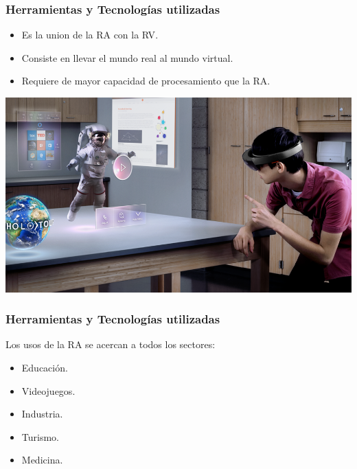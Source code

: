 \begin{frame}
	\frametitle{Herramientas y Tecnologías utilizadas}
			\begin{itemize}
				\item {Es la union de la RA con la RV}.
				\item {Consiste en llevar el mundo real al mundo virtual.}
				\item {Requiere de mayor capacidad de procesamiento que la RA.}
			\end{itemize}
		\endblock{}
		\vfill 
			\begin{center}
				\includegraphics[width=0.74\linewidth]{Images/rm}
			\end{center}
\end{frame}


\begin{frame}
	\frametitle{Herramientas y Tecnologías utilizadas}
		Los usos de la RA se acercan a todos los sectores:
		\begin{itemize}
			\item {Educación}.
			\item {Videojuegos.}
			\item {Industria.}
			\item {Turismo.}
			\item {Medicina.}
		\end{itemize}

	\endblock{}
\end{frame}



